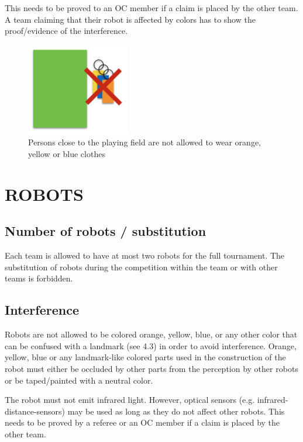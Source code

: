 \documentclass{article}
\begin{document}
This needs to be proved to an OC member if a claim is placed by the other team.
A team claiming that their robot is affected by colors has to show the
proof/evidence of the interference.

\begin{figure}[H]
    \centering
    \includegraphics[width=0.4\textwidth]{media/image2.png}
    \caption{Persons close to the playing field are not allowed to wear orange,
        yellow or blue clothes}
    \label{fig:spectators}
\end{figure}


\section{ROBOTS\label{ref-018}}

\subsection{ Number of robots / substitution \label{ref-019}}

Each team is allowed to have at most two robots for the full tournament. The
substitution of robots during the competition within the team or with other
teams is forbidden.

\subsection{ Interference \label{ref-020}}

Robots are not allowed to be colored orange, yellow, blue, or any other color
that can be confused with a landmark (see 4.3) in order to avoid interference.
Orange, yellow, blue or any landmark-like colored parts used in the
construction of the robot must either be occluded by other parts from the
perception by other robots or be taped/painted with a neutral color.

The robot must not emit infrared light. However, optical sensors (e.g.
infrared-distance-sensors) may be used as long as they do not affect other
robots. This needs to be proved by a referee or an OC member if a claim is
placed by the other team.
\end{document}
